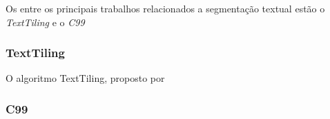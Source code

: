 



Os entre os principais trabalhos relacionados a segmentação textual estão o \textit{TextTiling} e o \textit{C99}



\subsubsection{TextTiling}
	O algoritmo TextTiling, proposto por \cite{fulano} 

\subsubsection{C99}



